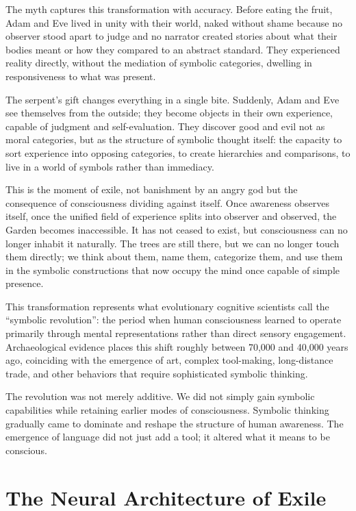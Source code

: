 The myth captures this transformation with accuracy. Before eating the fruit, Adam and Eve lived in unity with their world, naked without shame because no observer stood apart to judge and no narrator created stories about what their bodies meant or how they compared to an abstract standard. They experienced reality directly, without the mediation of symbolic categories, dwelling in responsiveness to what was present.

The serpent's gift changes everything in a single bite. Suddenly, Adam and Eve see themselves from the outside; they become objects in their own experience, capable of judgment and self-evaluation. They discover good and evil not as moral categories, but as the structure of symbolic thought itself: the capacity to sort experience into opposing categories, to create hierarchies and comparisons, to live in a world of symbols rather than immediacy.

This is the moment of exile, not banishment by an angry god but the consequence of consciousness dividing against itself. Once awareness observes itself, once the unified field of experience splits into observer and observed, the Garden becomes inaccessible. It has not ceased to exist, but consciousness can no longer inhabit it naturally. The trees are still there, but we can no longer touch them directly; we think about them, name them, categorize them, and use them in the symbolic constructions that now occupy the mind once capable of simple presence.

This transformation represents what evolutionary cognitive scientists call the “symbolic revolution”: the period when human consciousness learned to operate primarily through mental representations rather than direct sensory engagement. Archaeological evidence places this shift roughly between 70,000 and 40,000 years ago, coinciding with the emergence of art, complex tool-making, long-distance trade, and other behaviors that require sophisticated symbolic thinking.

The revolution was not merely additive. We did not simply gain symbolic capabilities while retaining earlier modes of consciousness. Symbolic thinking gradually came to dominate and reshape the structure of human awareness. The emergence of language did not just add a tool; it altered what it means to be conscious.

\section{The Neural Architecture of Exile}

